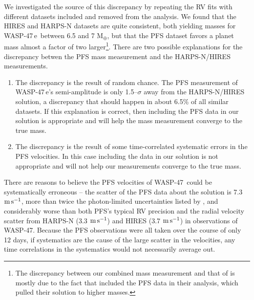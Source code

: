 \documentclass{emulateapj}
\newcommand{\thisstar}{WASP-47}
\newcommand{\thisfirstplanet}{WASP-47\,b}
\newcommand{\thissecondplanet}{WASP-47\,e}
\newcommand{\thisthirdplanet}{WASP-47\,d}
\newcommand{\thisfourthplanet}{WASP-47\,c}
\newcommand{\mearth}{M$_\oplus$}
\newcommand{\ms}{\ensuremath{\rm m\,s^{-1}}}
\begin{document}

We investigated the source of this discrepancy by repeating the RV fits with different datasets included and removed from the analysis. We found that the HIRES and HARPS-N datasets are quite consistent, both yielding masses for \thissecondplanet\ between 6.5 and 7 \mearth, but that the PFS dataset favors a planet mass almost a factor of two larger\footnote{The discrepancy between our combined mass measurement and that of \citet{sinukoffw47} is mostly due to the fact that \citet{sinukoffw47} included the PFS data in their analysis, which pulled their solution to higher masses.}. There are two possible explanations for the discrepancy betwen the PFS mass measurement and the HARPS-N/HIRES measurements.
\begin{enumerate}
\item The discrepancy is the result of random chance. The PFS measurement of \thissecondplanet's semi-amplitude is only 1.5--$\sigma$ away from the HARPS-N/HIRES solution, a discrepancy that should happen in about 6.5\% of all similar datasets. If this explanation is correct, then including the PFS data in our solution is appropriate and will help the mass measurement converge to the true mass.  
\item The discrepancy is the result of some time-correlated systematic errors in the PFS velocities. In this case including the data in our solution is not appropriate and will not help our measurements converge to the true mass. 
\end{enumerate}

There are reasons to believe the PFS velocities of \thisstar\ could be systematically erroneous -- the scatter of the PFS data about the solution is 7.3 \ms, more than twice the photon-limited uncertainties listed by \citet{dai}, and considerably worse than both PFS's typical RV precision \citep[better than 2 \ms,][]{teskepfs} and the radial velocity scatter from HARPS-N (3.3 \ms) and HIRES (3.7 \ms) in observations of \thisstar. Because the PFS observations were all taken over the course of only 12 days, if systematics are the cause of the large scatter in the velocities, any time correlations in the systematics would not necessarily average out.
\end{document}
